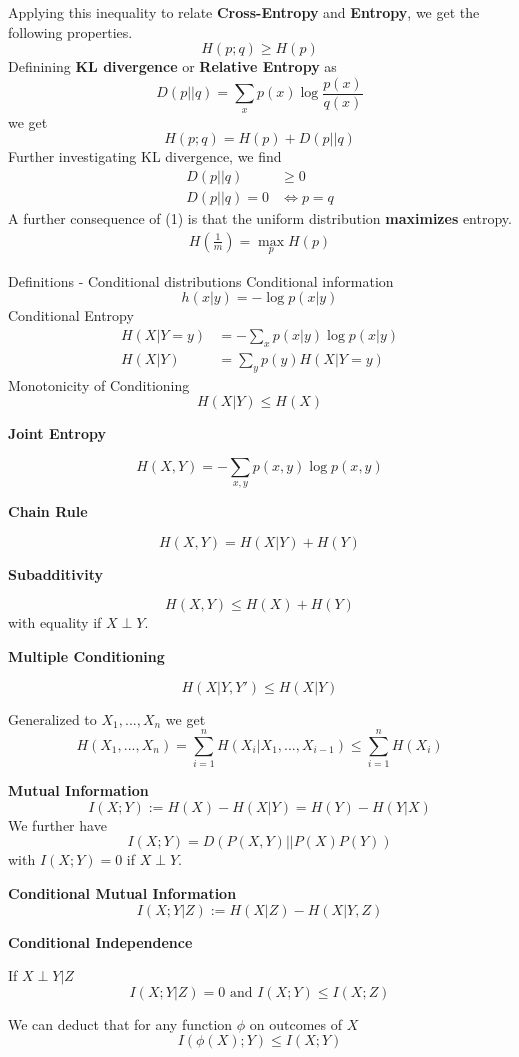 Applying this inequality to relate \textbf{Cross-Entropy} and \textbf{Entropy}, we get the following properties.
\[H(p; q) \geq H(p)\]
    Definining \textbf{KL divergence} or \textbf{Relative Entropy} as
    \[D(p || q) = \sum_{x} p(x) \log \frac{p(x)}{q(x)}\]
    we get
    \[H(p; q) = H(p) + D(p || q)\]
    Further investigating KL divergence, we find 
    \begin{align}
        D(p||q) &\geq 0\\
        D(p||q) = 0 &\iff p = q
    \end{align}
    A further consequence of (1) is that the uniform distribution \textbf{maximizes} entropy.
    \begin{align*}
        H\left(\frac{1}{m}\right) = \max_{p}H(p)
    \end{align*}
    \begin{mainbox}
        {Definitions - Conditional distributions}
        Conditional information
        \[h(x|y) = - \log p(x|y)\]
        Conditional Entropy
        \begin{align*}
            H(X | Y = y) &= - \sum_{x}p(x|y) \log p(x|y)\\
            H(X|Y) &= \sum_{y} p(y)H(X|Y = y)
        \end{align*}
        Monotonicity of Conditioning
        \[H(X|Y) \leq H(X)\]
    \end{mainbox}
    \textbf{Joint Entropy}

    \[H(X, Y) = - \sum_{x, y}p(x,y) \log p(x, y)\]

    \textbf{Chain Rule}

    \[H(X, Y) = H(X | Y) + H(Y)\]

    \textbf{Subadditivity}

    \[H(X, Y) \leq H(X) + H(Y)\]
    with equality if \(X \perp Y\).

    \textbf{Multiple Conditioning}

    \[H(X | Y, Y') \leq H(X|Y)\]

    Generalized to \(X_1, ..., X_n\) we get
    \[H(X_1, ..., X_n) = \sum_{i = 1}^n H(X_i | X_1, ..., X_{i-1}) \leq \sum_{i = 1}^n H(X_i)\]

    \textbf{Mutual Information}
    \[I(X; Y) := H(X) - H(X|Y) = H(Y) - H(Y|X)\]
    We further have 
    \[I(X; Y) = D(P(X, Y) || P(X)P(Y))\]
    with \(I(X;Y) = 0\) if \(X \perp Y\).

    \textbf{Conditional Mutual Information}
    \[I(X; Y|Z) := H(X|Z) - H(X|Y, Z)\]

    \textbf{Conditional Independence}
    
    If \(X \perp Y|Z\) 
    \[I(X; Y | Z) = 0 \text{ and }I(X;Y) \leq I(X;Z)\]

    We can deduct that for any function \(\phi\) on outcomes of \(X\)
    \[I(\phi(X); Y) \leq I(X;Y)\]




